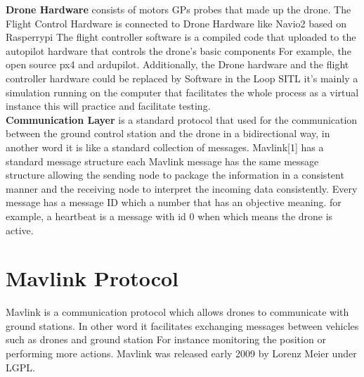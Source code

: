 \textbf{Drone Hardware} consists of motors GPs probes that made up the drone.
The Flight Control Hardware is connected to Drone Hardware like Navio2 based on Rasperrypi
The flight controller software is a compiled code that uploaded to the autopilot hardware that controls the drone's basic components For example, the open source px4 and ardupilot. Additionally, the Drone hardware and the flight controller hardware could be replaced by Software in the Loop SITL it's mainly a simulation running on the computer that facilitates the whole process as a virtual instance this will practice and facilitate testing. \\ 

\textbf{Communication Layer} is a standard protocol that used for the communication between the ground control station and the drone in a bidirectional way, in another word it is like a standard collection of messages. Mavlink[1] has a standard message structure each Mavlink message has the same message structure allowing the sending node to package the information in a consistent manner and the receiving node to interpret the incoming data consistently. Every message has a message ID which a number that has an objective meaning. for example, a heartbeat is a message with id 0 when which means the drone is active.



\section{Mavlink Protocol}

Mavlink is a communication protocol which allows drones to communicate with ground stations. 
In other word it  facilitates exchanging messages between vehicles such as drones and ground station For instance monitoring the position or performing more actions.
Mavlink was released early 2009 by Lorenz Meier under LGPL. \\ 
 

